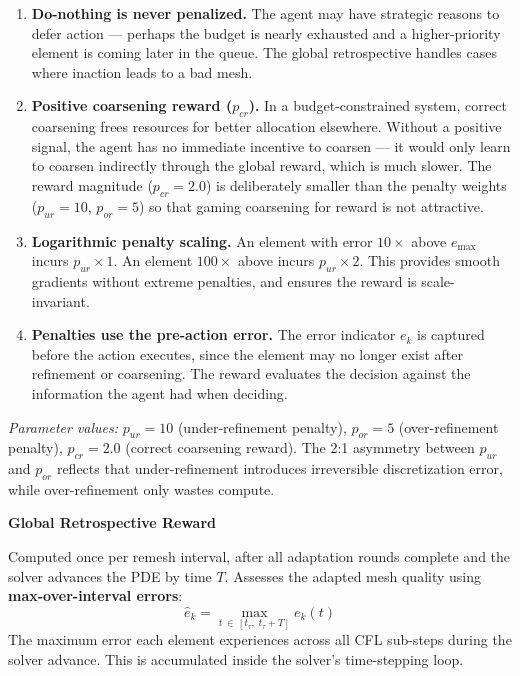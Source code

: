 \documentclass[11pt]{article}
\begin{document}
\begin{enumerate}[leftmargin=1.5em, itemsep=4pt]
    \item \textbf{Do-nothing is never penalized.} The agent may have strategic reasons to defer action --- perhaps the budget is nearly exhausted and a higher-priority element is coming later in the queue. The global retrospective handles cases where inaction leads to a bad mesh.
    
    \item \textbf{Positive coarsening reward ($p_{cr}$).} In a budget-constrained system, correct coarsening frees resources for better allocation elsewhere. Without a positive signal, the agent has no immediate incentive to coarsen --- it would only learn to coarsen indirectly through the global reward, which is much slower. The reward magnitude ($p_{cr} = 2.0$) is deliberately smaller than the penalty weights ($p_{ur} = 10$, $p_{or} = 5$) so that gaming coarsening for reward is not attractive.
    
    \item \textbf{Logarithmic penalty scaling.} An element with error $10\times$ above $e_{\max}$ incurs $p_{ur} \times 1$. An element $100\times$ above incurs $p_{ur} \times 2$. This provides smooth gradients without extreme penalties, and ensures the reward is scale-invariant.
    
    \item \textbf{Penalties use the pre-action error.} The error indicator $e_k$ is captured before the action executes, since the element may no longer exist after refinement or coarsening. The reward evaluates the decision against the information the agent had when deciding.
\end{enumerate}

\noindent\textit{Parameter values:} $p_{ur} = 10$ (under-refinement penalty), $p_{or} = 5$ (over-refinement penalty), $p_{cr} = 2.0$ (correct coarsening reward). The 2:1 asymmetry between $p_{ur}$ and $p_{or}$ reflects that under-refinement introduces irreversible discretization error, while over-refinement only wastes compute.

\vspace{0.5cm}
\noindent\textbf{\textcolor{solvercolor}{Global Retrospective Reward}}

\vspace{0.15cm}
\noindent Computed once per remesh interval, after all adaptation rounds complete and the solver advances the PDE by time $T$. Assesses the adapted mesh quality using \textbf{max-over-interval errors}:
\begin{equation}
\hat{e}_k = \max_{t \,\in\, [t_\tau,\; t_\tau + T]} e_k(t)
\end{equation}
The maximum error each element experiences across all CFL sub-steps during the solver advance. This is accumulated inside the solver's time-stepping loop.
\end{document}
